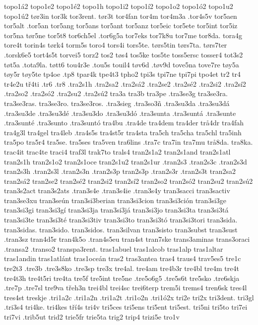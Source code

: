 {{topo1á2
topo1e2
topo1é2
topo1h
topo1i2
topo1í2
topo1o2
topo1ó2
topo1u2
topo1ú2
tør3in
tor3k
tor3rent.
tør3t
tor4fan
tor4m
tor4m3a
.tor4s5v
tor5aen
tor5alt
.tor5an
tor5ang
tor5ans
tor5ant
tor5anz
tor5eic
tor5ete
tor5int
tor5iz
tor5na
tør5ne
tor5t8
tor6ch5el
.tor6g5a
tor7eks
tor7k8u
tor7me
tor8da.
tora4g
tore4t
torin4s
tørk4
torm5s
toro4
tors4i
tors5te.
tørs5tin
tørs7ta.
tørs7ter
.torsk6e5
tort4s5t
torvei5
torz2
tos2
tøs4
tos5ke
tos5te
toss5ersc
tosser4
tot3s2
tøt5a
.tota9la.
tøtt6
tou4r3e
.tou5s
touil4
tøv6d
.tøv9d
tove5na
tove7re
tøy5a
tøy5r
tøy5te
tp4oe
.tp8
tpar4k
tpe4t3
tpho2
tpi3s
tpi7ne
tpi7pi
tpo4et
tr2
tr4
tr4e2u
tř4ti
.tr6
.tr8
.tra2s1h
.tra2sa2
.tra2sá2
.tra2se2
.tra2sé2
.tra2si2
.tra2sí2
.tra2so2
.tra2só2
.tra2su2
.tra2sú2
tra3a
tra3b
tra3pe
.tra3se3g
tra3se3ra.
tra3se3ras.
tra3se3ro.
tra3se3ros.
.tra3sieg
.tra3so3ñ
.tra3su3da
.tra3su3dá
.tra3su3de
.tra3su3dé
.tra3su3do
.tra3su3dó
.tra3sunta
.tra3suntá
.tra3sunte
.tra3sunté
.tra3sunto
.tra3suntó
tra4bu
.tra4de
tra4dem
tra4der
trå4dr
tra4fah
tra4g3l
tra4gel
tra4leb
.tra4s5s
tra4st5r
tra4sta
tra5ch
tra5cha
tra5chl
tra5inh
tra5po
tra5r4
tra5se.
tra5ses
tra5ven
tra6lins
.tra7c
tra7in
tra7mu
trå8da.
tra8ka.
trac4it
trac4te
traci4
traf3l
trak7to
trals4
tran2s1a2
tran2s1and
tran2s1atl
tran2s1h
tran2s1o2
tran2s1oce
tran2s1u2
tran2s1ur
.tran2s3
.tran2s3c
.tran2s3d
tran2s3h
.tran2s3l
.tran2s3n
.tran2s3p
tran2s3p
.tran2s3r
.tran2s3t
tran2sa2
tran2sá2
tran2se2
tran2sé2
tran2si2
tran2sí2
tran2so2
tran2só2
tran2su2
tran2sú2
tran3s2act
tran3s2ats
.tran3s4e
.tran3s4ie
.tran3s4y
tran3sacci
tran3sactiv
tran3se3xu
tran3seún
tran3si3berian
tran3si3cion
tran3si3ción
tran3si3ge
tran3si3gi
tran3si3gí
tran3si3ja
tran3si3já
tran3si3jo
tran3si3ta
tran3si3tá
tran3si3te
tran3si3té
tran3si3tiv
tran3si3to
tran3si3tó
tran3si3tori
tran3sida.
tran3sidas.
tran3sido.
tran3sidos.
tran3silvan
tran3sisto
tran3subst
tran3sust
.tran3sz
tran4d5r
tran4k5o
.tran4s5eu
tran4st
tran7ske
trans3aminas
trans3oraci
.transa2
.transo2
transpa3rent.
tras1abuel
tras1alcob
tras1alp
tras1altar
tras1andin
tras1atlánt
tras1oceán
tras2
tras3antea
tras4
traus4
trav5es5
tre1c
tre2t3
.tre3b
.tre3s8ko
.tre3sp
tre3x
tre4al.
tre4am
tre4b3r
tre4bl
tre4m
tre4t
tre4t3h
tre4t5ri
tre4ta
tre5f
tre5int
tre5ne
.tre5o6g5
.tre5s6t
tre5sko
.tre6skja
.tre7p
.tre7sl
tre9va
třeh3n
trei4bl
trei4sc
trei6terp
trem5i
trems4
tren6sk
tres4l
tres4st
treskje
.tri1a2c
.tri1a2n
.tri1a2t
.tri1o2n
.tri1ó2x
tri2e
tri2x
tri3dent.
tri3gl
.tri3s4
tri4ke.
tri4kes
tří4s
tri4v
tri5ces
tri5ens
tri5ent
tri5est.
tri5ni
tri5to
tri7ei
tri7vi
.trib5ut
trid2
trie5fr
trie5ta
trig2
trip4
trizi5e
tro1v
}}
